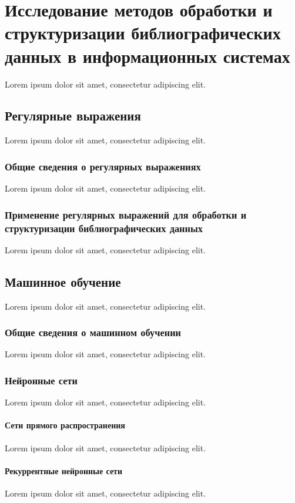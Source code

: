 \chapter{Исследование методов обработки и структуризации библиографических данных в информационных системах}
Lorem ipsum dolor sit amet, consectetur adipiscing elit.

\section{Регулярные выражения}
Lorem ipsum dolor sit amet, consectetur adipiscing elit.

\subsection{Общие сведения о регулярных выражениях}
Lorem ipsum dolor sit amet, consectetur adipiscing elit.

\subsection{Применение регулярных выражений для обработки и структуризации библиографических данных}
Lorem ipsum dolor sit amet, consectetur adipiscing elit.

\section{Машинное обучение}
Lorem ipsum dolor sit amet, consectetur adipiscing elit.

\subsection{Общие сведения о машинном обучении}
Lorem ipsum dolor sit amet, consectetur adipiscing elit.

\subsection{Нейронные сети}
Lorem ipsum dolor sit amet, consectetur adipiscing elit.

\subsubsection{Сети прямого распространения}
Lorem ipsum dolor sit amet, consectetur adipiscing elit.

\subsubsection{Рекуррентные нейронные сети}
Lorem ipsum dolor sit amet, consectetur adipiscing elit.

